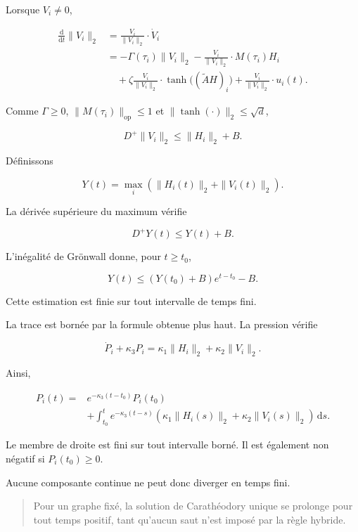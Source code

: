 Lorsque \(V_i\neq0\),

\[
\begin{aligned}
\frac{\mathrm d}{\mathrm dt}\|V_i\|_2
&=
\frac{V_i}{\|V_i\|_2}\cdot\dot V_i
\\
&=
-\Gamma(\tau_i)\|V_i\|_2
-
\frac{V_i}{\|V_i\|_2}\cdot M(\tau_i)H_i
\\
&\quad+
\zeta
\frac{V_i}{\|V_i\|_2}
\cdot
\tanh\!\bigl((\widetilde A H)_i\bigr)
+
\frac{V_i}{\|V_i\|_2}\cdot u_i(t).
\end{aligned}
\]

Comme \(\Gamma\geq0\), \(\|M(\tau_i)\|_{\mathrm{op}}\leq1\) et
\(\|\tanh(\cdot)\|_2\leq\sqrt d\),

\[
D^+\|V_i\|_2
\leq
\|H_i\|_2+B.
\]

Définissons

\[
Y(t)
=
\max_i
\left(
\|H_i(t)\|_2+\|V_i(t)\|_2
\right).
\]

La dérivée supérieure du maximum vérifie

\[
D^+Y(t)
\leq
Y(t)+B.
\]

L'inégalité de Grönwall donne, pour \(t\geq t_0\),

\[
\boxed{
Y(t)
\leq
\left(
Y(t_0)+B
\right)
e^{t-t_0}
-
B.
}
\]

Cette estimation est finie sur tout intervalle de temps fini.

La trace est bornée par la formule obtenue plus haut. La pression
vérifie

\[
\dot P_i
+
\kappa_3P_i
=
\kappa_1\|H_i\|_2+\kappa_2\|V_i\|_2.
\]

Ainsi,

\[
\begin{aligned}
P_i(t)
={}&
e^{-\kappa_3(t-t_0)}P_i(t_0)
\\
&+
\int_{t_0}^t
e^{-\kappa_3(t-s)}
\left(
\kappa_1\|H_i(s)\|_2
+
\kappa_2\|V_i(s)\|_2
\right)
\,\mathrm ds.
\end{aligned}
\]

Le membre de droite est fini sur tout intervalle borné. Il est
également non négatif si \(P_i(t_0)\geq0\).

Aucune composante continue ne peut donc diverger en temps fini.

\begin{quote}
Pour un graphe fixé, la solution de Carathéodory unique se prolonge
pour tout temps positif, tant qu'aucun saut n'est imposé par la règle
hybride.
\end{quote}

